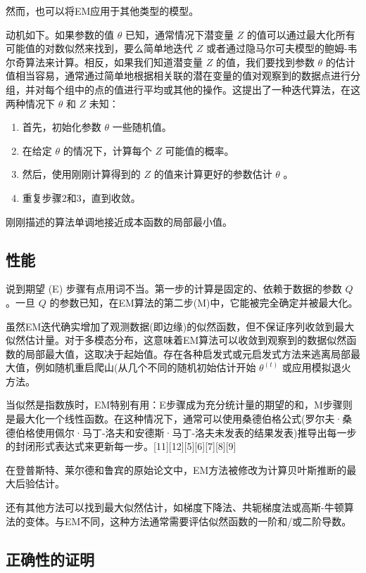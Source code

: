 然而，也可以将EM应用于其他类型的模型。

动机如下。如果参数的值 $\theta$ 已知，通常情况下潜变量 $Z$ 的值可以通过最大化所有可能值的对数似然来找到，要么简单地迭代 $Z$ 或者通过隐马尔可夫模型的鲍姆-韦尔奇算法来计算。相反，如果我们知道潜变量 $Z$ 的值，我们要找到参数 $\theta$ 的估计值相当容易，通常通过简单地根据相关联的潜在变量的值对观察到的数据点进行分组，并对每个组中的点的值进行平均或其他的操作。这提出了一种迭代算法，在这两种情况下 $\theta$ 和 $Z$ 未知：

\begin{enumerate}
\item 首先，初始化参数 $\theta$ 一些随机值。
\item 在给定 $\theta$ 的情况下，计算每个 $Z$ 可能值的概率。
\item 然后，使用刚刚计算得到的 $Z$ 的值来计算更好的参数估计 $\theta$ 。
\item 重复步骤2和3，直到收敛。
\end{enumerate}

刚刚描述的算法单调地接近成本函数的局部最小值。

\subsection{性能}

说到期望 (E) 步骤有点用词不当。第一步的计算是固定的、依赖于数据的参数 $Q$。一旦 $Q$ 的参数已知，在EM算法的第二步(M)中，它能被完全确定并被最大化。

虽然EM迭代确实增加了观测数据(即边缘)的似然函数，但不保证序列收敛到最大似然估计量。对于多模态分布，这意味着EM算法可以收敛到观察到的数据似然函数的局部最大值，这取决于起始值。存在各种启发式或元启发式方法来逃离局部最大值，例如随机重启爬山(从几个不同的随机初始估计开始 $\theta^{(t)}$ 或应用模拟退火方法。

当似然是指数族时，EM特别有用：E步骤成为充分统计量的期望的和，M步骤则是最大化一个线性函数。在这种情况下，通常可以使用桑德伯格公式(罗尔夫·桑德伯格使用佩尔·马丁-洛夫和安德斯·马丁-洛夫未发表的结果发表)推导出每一步的封闭形式表达式来更新每一步。[11][12][5][6][7][8][9]

在登普斯特、莱尔德和鲁宾的原始论文中，EM方法被修改为计算贝叶斯推断的最大后验估计。

还有其他方法可以找到最大似然估计，如梯度下降法、共轭梯度法或高斯-牛顿算法的变体。与EM不同，这种方法通常需要评估似然函数的一阶和/或二阶导数。

\subsection{正确性的证明}


